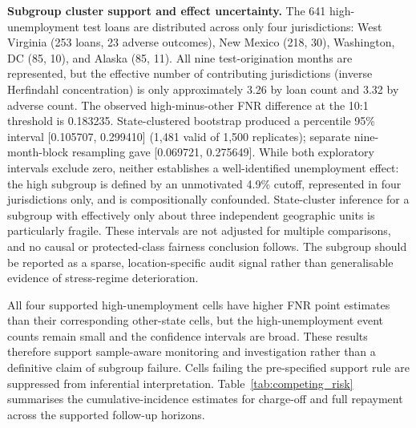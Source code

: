\documentclass[10pt]{article}
\begin{document}
\noindent\textbf{Subgroup cluster support and effect uncertainty.} The 641 high-unemployment test loans are distributed across only four jurisdictions: West Virginia (253 loans, 23 adverse outcomes), New Mexico (218, 30), Washington, DC (85, 10), and Alaska (85, 11). All nine test-origination months are represented, but the effective number of contributing jurisdictions (inverse Herfindahl concentration) is only approximately 3.26 by loan count and 3.32 by adverse count. The observed high-minus-other FNR difference at the 10:1 threshold is 0.183235. State-clustered bootstrap produced a percentile 95\% interval [0.105707, 0.299410] (1,481 valid of 1,500 replicates); separate nine-month-block resampling gave [0.069721, 0.275649]. While both exploratory intervals exclude zero, neither establishes a well-identified unemployment effect: the high subgroup is defined by an unmotivated 4.9\% cutoff, represented in four jurisdictions only, and is compositionally confounded. State-cluster inference for a subgroup with effectively only about three independent geographic units is particularly fragile. These intervals are not adjusted for multiple comparisons, and no causal or protected-class fairness conclusion follows. The subgroup should be reported as a sparse, location-specific audit signal rather than generalisable evidence of stress-regime deterioration.


All four supported high-unemployment cells have higher FNR point estimates than their corresponding other-state cells, but the high-unemployment event counts remain small and the confidence intervals are broad. These results therefore support sample-aware monitoring and investigation rather than a definitive claim of subgroup failure. Cells failing the pre-specified support rule are suppressed from inferential interpretation. Table~\ref{tab:competing_risk} summarises the cumulative-incidence estimates for charge-off and full repayment across the supported follow-up horizons.
\end{document}
